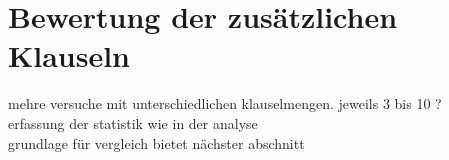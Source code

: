 \chapter{Bewertung der zusätzlichen Klauseln}
\label{chp:bewertung}

mehre versuche mit unterschiedlichen klauselmengen. jeweils 3 bis 10 ?\\
erfassung der statistik wie in der analyse\\
grundlage für vergleich bietet nächster abschnitt







